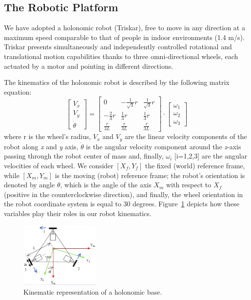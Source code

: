 {\subsection{The Robotic Platform}\label{roboplat} 
We have adopted a holonomic robot ({Triskar}), free to move in any direction at a maximum speed comparable to that of people in indoor environments (1.4 m/s). Triskar presents simultaneously and independently controlled rotational and translational motion capabilities thanks to three omni-directional wheels, each actuated by a motor and pointing in different directions.

The kinematics of the holonomic robot is described by the following matrix equation:
\begin{equation}
\begin{bmatrix}
V_x \\ V_y \\ \dot{\theta} 
\end{bmatrix} = 
\begin{bmatrix}
0 & -\frac{1}{\sqrt{3}}r & \frac{1}{\sqrt{3}}r \\
-\frac{2}{3}r & \frac{1}{3}r & \frac{1}{3}r \\
\frac{r}{3L} & \frac{r}{3L} & \frac{r}{3L}
\end{bmatrix}\cdot
\begin{bmatrix}
\omega_1 \\ \omega_2 \\ \omega_3
\end{bmatrix}
\end{equation}
where r is the wheel's radius, $V_x$ and $V_y$ are the linear velocity components of the robot along \textit{x} and \textit{y} axis, $\dot{\theta}$ is the angular velocity component around the \textit{z}-axis passing through the robot center of mass and, finally, $\omega_i$ [i=1,2,3] are the angular velocities of each wheel. We consider $[X_f, Y_f]$ the fixed (world) reference frame, while $[X_m, Y_m]$ is the moving (robot) reference frame; the robot's orientation is denoted by angle $\theta$, which is the angle of the axis $X_m$ with respect to $X_f$ (positive in the counterclockwise direction), and finally, the wheel orientation in the robot coordinate system is equal to 30 degrees. Figure~\ref{kinematic} depicts how these variables play their roles in our robot kinematics.

\begin{figure}[H]
\centering
\includegraphics[width=0.35\textwidth, height=0.25\textwidth]{images/05-modeling/kinematic.png}
\caption{Kinematic representation of a holonomic base.}
\label{kinematic}
\end{figure}

}

